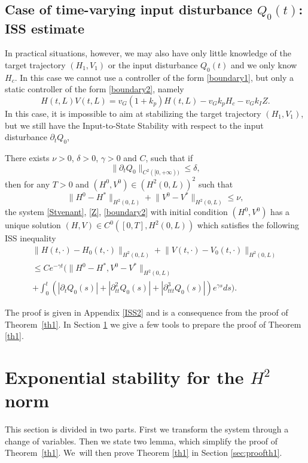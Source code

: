 \subsection{Case of time-varying input disturbance $Q_{0}(t)$: ISS estimate}
In practical situations, however, we may also have only
little knowledge of the target trajectory $(H_{1},V_{1})$ or the input disturbance $Q_{0}(t)$ and we only know $H_{c}$. In this case we cannot use a controller of the form \eqref{boundary1},
but only a static controller of the form \eqref{boundary2}, namely\vspace*{-3pt}
\begin{equation*}
H(t,L)V(t,L)=v_{G}(1+k_{p})H(t,L)-v_{G}k_{p}H_{c}-v_{G}k_{I}Z.
\end{equation*}
In this case, it is impossible to aim at stabilizing the target trajectory $(H_{1},V_{1})$, but we still have the Input-to-State Stability with respect to the input disturbance $\partial_{t}Q_{0}$,
\begin{thm}
\label{th2}
There exists $\nu>0$, $\delta>0$, $\gamma>0$ and $C$, such that if\vspace*{-3pt}
\[
\lVert\partial_{t}Q_{0}\rVert_{C^{2}([0,+\infty))}\leq\delta,
\]
then for any $T>0$ and $(H^{0},V^{0})\in {(H^{2}(0,L))^{2}}$ such that\vspace*{-3pt}
\begin{equation*}
\lVert H^{0}-H^{*}\rVert_{H^{2}(0,L)}+\lVert V^{0}-V^{*}\rVert_{H^{2}(0,L)}\leq \nu,
\end{equation*}
the system \eqref{Stvenant}, \eqref{Z}, \eqref{boundary2} with initial condition $(H^{0},V^{0})$ has a unique solution $(H,V)\in C^{0}([0,T],H^{2}(0,L))$ which satisfies the following ISS inequality
\begin{multline}
\label{ISSHV}
\lVert H(t,\cdot)-H_{0}(t,\cdot)\rVert_{H^{2}(0,L)}+\lVert V(t,\cdot)-V_{0}(t,\cdot)\rVert_{H^{2}(0,L)}\\
\leq Ce^{-\gamma t}\biggl(\lVert H^{0}-H^{*},V^{0}-V^{*}\rVert_{H^{2}(0,L)}\\[-3pt]
+\int_{0}^{t}(|\partial_{t}Q_{0}(s)|+|\partial_{tt}^{2}Q_{0}(s)|+|\partial_{ttt}^{3}Q_{0}(s)|)e^{\gamma s}ds\biggr).
\end{multline}
\end{thm}
The proof is given in Appendix \ref{ISS2} and is a consequence from the proof of Theorem~\ref{th1}.
In Section \ref{s2} we {give a few tools to prepare the proof of} Theorem \ref{th1}.
\section{Exponential stability for the \texorpdfstring{$H^{2}$}{H2} norm}
\label{s2}
This section is divided in {two} parts. First we transform the system through a change of variables.
Then we state two lemma, which simplify the proof of Theorem~\ref{th1}.
{We~will then prove Theorem \ref{th1} in Section \ref{sec:proofth1}.}

